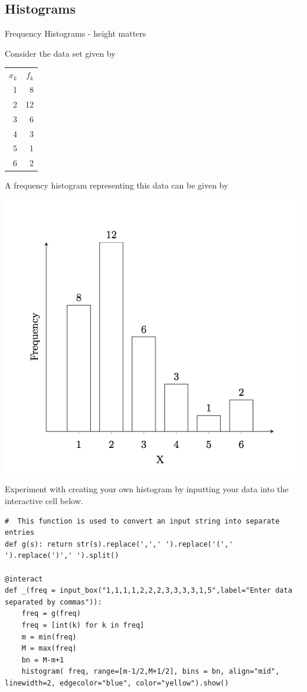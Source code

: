\documentclass[10pt,]{book}
\theoremstyle{plain}
\theoremstyle{definition}
\theoremstyle{definition}
\theoremstyle{definition}
\numberwithin{equation}{section}
\newcommand{\hrulemedium}{\noalign{\hrule height 0.07em}}
\begin{document}
\subsection[{Histograms}]{Histograms}\label{subsection-3}
Frequency Histograms - height matters%
\par
Consider the data set given by
		
\leavevmode%
\begin{table}
\centering
\begin{tabular}{rr}
\(x_k\)&\(f_k\)\tabularnewline\hrulemedium
1&8\tabularnewline[0pt]
2&12\tabularnewline[0pt]
3&6\tabularnewline[0pt]
4&3\tabularnewline[0pt]
5&1\tabularnewline[0pt]
6&2
\end{tabular}
\end{table}

	
A frequency histogram representing this data can be given by

\includegraphics[width=1\linewidth]{images/frequencyhistogram.png}

		
		
%
\par
Experiment with creating your own histogram by inputting your data into the interactive cell below.
\begin{lstlisting}[style=sageinput]
#  This function is used to convert an input string into separate entries
def g(s): return str(s).replace(',',' ').replace('(',' ').replace(')',' ').split()

@interact
def _(freq = input_box("1,1,1,1,2,2,2,3,3,3,3,1,5",label="Enter data separated by commas")):
    freq = g(freq)
    freq = [int(k) for k in freq]
    m = min(freq)
    M = max(freq)
    bn = M-m+1
    histogram( freq, range=[m-1/2,M+1/2], bins = bn, align="mid", linewidth=2, edgecolor="blue", color="yellow").show()
\end{lstlisting}
\end{document}
